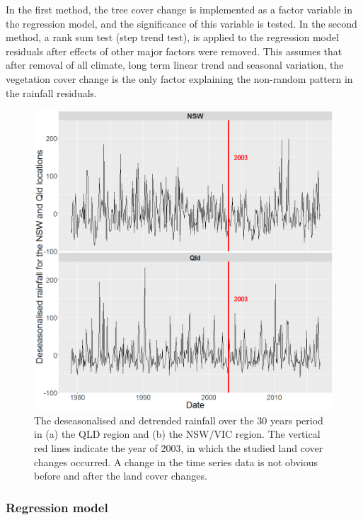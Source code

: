 \documentclass[fleqn,10pt,lineno]{wlpeerj} %
\begin{document}
In the first method, the tree cover change is implemented as a factor
variable in the regression model, and the significance of this variable
is tested. In the second method, a rank sum test (step trend test), is
applied to the regression model residuals after effects of other major
factors were removed. This assumes that after removal of all climate,
long term linear trend and seasonal variation, the vegetation cover
change is the only factor explaining the non-random pattern in the
rainfall residuals.

\begin{figure}
\includegraphics[width=0.9\linewidth]{figures/Rainfall_resid} \caption{The deseasonalised and detrended rainfall over the 30 years period in (a) the QLD region and (b) the NSW/VIC region. The vertical red lines indicate the year of 2003, in which the studied land cover changes occurred. A change in the time series data is not obvious before and after the land cover changes.}\label{fig:ts-mean}
\end{figure}

\subsubsection{Regression model}\label{reg_model}
\end{document}
